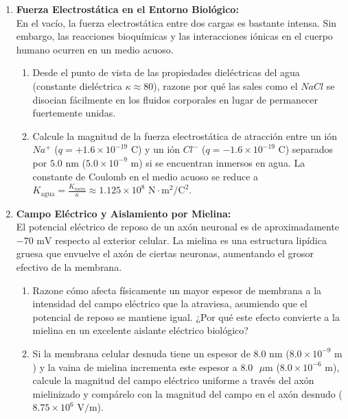\documentclass[11pt,letterpaper]{article}
\begin{document}
\begin{enumerate}[leftmargin=*]

    \item \textbf{Fuerza Electrostática en el Entorno Biológico:}\\
    En el vacío, la fuerza electrostática entre dos cargas es bastante intensa. Sin embargo, las reacciones bioquímicas y las interacciones iónicas en el cuerpo humano ocurren en un medio acuoso.
    \begin{enumerate}
        \item Desde el punto de vista de las propiedades dieléctricas del agua (constante dieléctrica $\kappa \approx 80$), razone por qué las sales como el $NaCl$ se disocian fácilmente en los fluidos corporales en lugar de permanecer fuertemente unidas.
        \item Calcule la magnitud de la fuerza electrostática de atracción entre un ión $Na^+$ ($q = +1.6 \times 10^{-19} \text{ C}$) y un ión $Cl^-$ ($q = -1.6 \times 10^{-19} \text{ C}$) separados por $5.0 \text{ nm}$ ($5.0 \times 10^{-9} \text{ m}$) si se encuentran inmersos en agua. La constante de Coulomb en el medio acuoso se reduce a $K_{\text{agua}} = \frac{K_{\text{vacío}}}{\kappa} \approx 1.125 \times 10^8 \text{ N}\cdot\text{m}^2/\text{C}^2$.
    \end{enumerate}

    \vspace{0.2cm}

    \item \textbf{Campo Eléctrico y Aislamiento por Mielina:}\\
    El potencial eléctrico de reposo de un axón neuronal es de aproximadamente $-70 \text{ mV}$ respecto al exterior celular. La mielina es una estructura lipídica gruesa que envuelve el axón de ciertas neuronas, aumentando el grosor efectivo de la membrana.
    \begin{enumerate}
        \item Razone cómo afecta físicamente un mayor espesor de membrana a la intensidad del campo eléctrico que la atraviesa, asumiendo que el potencial de reposo se mantiene igual. ¿Por qué este efecto convierte a la mielina en un excelente aislante eléctrico biológico?
        \item Si la membrana celular desnuda tiene un espesor de $8.0 \text{ nm}$ ($8.0 \times 10^{-9} \text{ m}$) y la vaina de mielina incrementa este espesor a $8.0 \text{ }\mu\text{m}$ ($8.0 \times 10^{-6} \text{ m}$), calcule la magnitud del campo eléctrico uniforme a través del axón mielinizado y compárelo con la magnitud del campo en el axón desnudo ($8.75 \times 10^6 \text{ V/m}$).
    \end{enumerate}


\end{enumerate}
\end{document}
